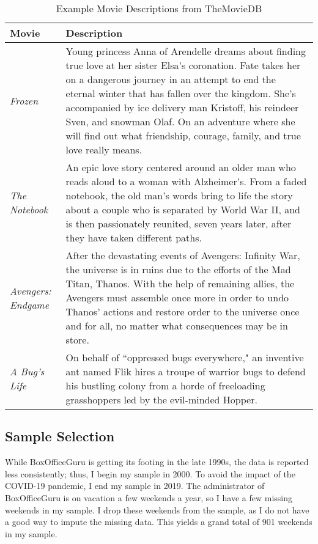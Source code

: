 \documentclass{article}
\begin{document}
\begin{table}
    \begin{tabular}{lp{11cm}}
        \toprule 
        \textbf{Movie} & \textbf{Description} \\
        \midrule
        \emph{Frozen} & Young princess Anna of Arendelle dreams about finding true love at her sister Elsa’s coronation. Fate takes her on a dangerous journey in an attempt to end the eternal winter that has fallen over the kingdom. She's accompanied by ice delivery man Kristoff, his reindeer Sven, and snowman Olaf. On an adventure where she will find out what friendship, courage, family, and true love really means. \\
        \emph{The Notebook} & An epic love story centered around an older man who reads aloud to a woman with Alzheimer's. From a faded notebook, the old man's words bring to life the story about a couple who is separated by World War II, and is then passionately reunited, seven years later, after they have taken different paths. \\
        \emph{Avengers: Endgame} & After the devastating events of Avengers: Infinity War, the universe is in ruins due to the efforts of the Mad Titan, Thanos. With the help of remaining allies, the Avengers must assemble once more in order to undo Thanos' actions and restore order to the universe once and for all, no matter what consequences may be in store. \\
        \emph{A Bug's Life} & On behalf of ``oppressed bugs everywhere," an inventive ant named Flik hires a troupe of warrior bugs to defend his bustling colony from a horde of freeloading grasshoppers led by the evil-minded Hopper. \\
        \bottomrule
    \end{tabular} 
    \caption{Example Movie Descriptions from TheMovieDB}
    \label{tab:tmdb_desc}
\end{table}

\subsection{Sample Selection}

While BoxOfficeGuru is getting its footing in the late 1990s, the data is reported less consistently; thus, I begin my sample in 2000. To avoid the impact of the COVID-19 pandemic, I end my sample in 2019. The administrator of BoxOfficeGuru is on vacation a few weekends a year, so I have a few missing weekends in my sample. I drop these weekends from the sample, as I do not have a good way to impute the missing data. This yields a grand total of 901 weekends in my sample.
\end{document}
